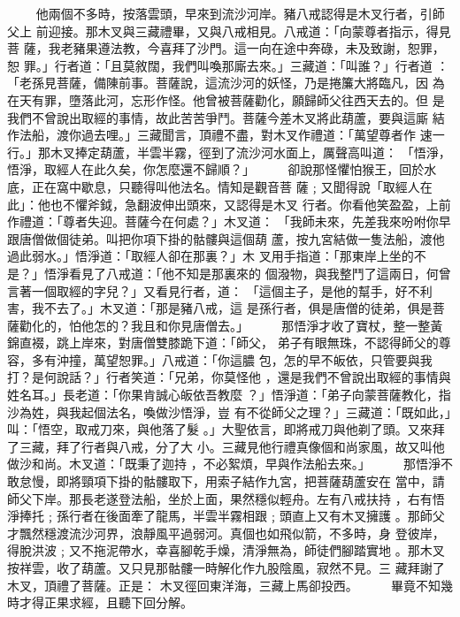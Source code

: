 \begin{pinyinscope}
{　　
他兩個不多時，按落雲頭，早來到流沙河岸。豬八戒認得是木叉行者，引師父上
前迎接。那木叉與三藏禮畢，又與八戒相見。八戒道：「向蒙尊者指示，得見菩
薩，我老豬果遵法教，今喜拜了沙門。這一向在途中奔碌，未及致謝，恕罪，恕
罪。」行者道：「且莫敘闊，我們叫喚那廝去來。」三藏道：「叫誰？」行者道
：「老孫見菩薩，備陳前事。菩薩說，這流沙河的妖怪，乃是捲簾大將臨凡，因
為在天有罪，墮落此河，忘形作怪。他曾被菩薩勸化，願歸師父往西天去的。但
是我們不曾說出取經的事情，故此苦苦爭鬥。菩薩今差木叉將此葫蘆，要與這廝
結作法船，渡你過去哩。」三藏聞言，頂禮不盡，對木叉作禮道：「萬望尊者作
速一行。」那木叉捧定葫蘆，半雲半霧，徑到了流沙河水面上，厲聲高叫道：
「悟淨，悟淨，取經人在此久矣，你怎麼還不歸順？」
　　
卻說那怪懼怕猴王，回於水底，正在窩中歇息，只聽得叫他法名。情知是觀音菩
薩﹔又聞得說「取經人在此」：他也不懼斧鉞，急翻波伸出頭來，又認得是木叉
行者。你看他笑盈盈，上前作禮道：「尊者失迎。菩薩今在何處？」木叉道：
「我師未來，先差我來吩咐你早跟唐僧做個徒弟。叫把你項下掛的骷髏與這個葫
蘆，按九宮結做一隻法船，渡他過此弱水。」悟淨道：「取經人卻在那裏？」木
叉用手指道：「那東岸上坐的不是？」悟淨看見了八戒道：「他不知是那裏來的
個潑物，與我整鬥了這兩日，何曾言著一個取經的字兒？」又看見行者，道：
「這個主子，是他的幫手，好不利害，我不去了。」木叉道：「那是豬八戒，這
是孫行者，俱是唐僧的徒弟，俱是菩薩勸化的，怕他怎的？我且和你見唐僧去。」
　　
那悟淨才收了寶杖，整一整黃錦直裰，跳上岸來，對唐僧雙膝跪下道：「師父，
弟子有眼無珠，不認得師父的尊容，多有沖撞，萬望恕罪。」八戒道：「你這膿
包，怎的早不皈依，只管要與我打？是何說話？」行者笑道：「兄弟，你莫怪他
，還是我們不曾說出取經的事情與姓名耳。」長老道：「你果肯誠心皈依吾教麼
？」悟淨道：「弟子向蒙菩薩教化，指沙為姓，與我起個法名，喚做沙悟淨，豈
有不從師父之理？」三藏道：「既如此，」叫：「悟空，取戒刀來，與他落了髮
。」大聖依言，即將戒刀與他剃了頭。又來拜了三藏，拜了行者與八戒，分了大
小。三藏見他行禮真像個和尚家風，故又叫他做沙和尚。木叉道：「既秉了迦持
，不必絮煩，早與作法船去來。」
　　
那悟淨不敢怠慢，即將頸項下掛的骷髏取下，用索子結作九宮，把菩薩葫蘆安在
當中，請師父下岸。那長老遂登法船，坐於上面，果然穩似輕舟。左有八戒扶持
，右有悟淨捧托﹔孫行者在後面牽了龍馬，半雲半霧相跟﹔頭直上又有木叉擁護
。那師父才飄然穩渡流沙河界，浪靜風平過弱河。真個也如飛似箭，不多時，身
登彼岸，得脫洪波﹔又不拖泥帶水，幸喜腳乾手燥，清淨無為，師徒們腳踏實地
。那木叉按祥雲，收了葫蘆。又只見那骷髏一時解化作九股陰風，寂然不見。三
藏拜謝了木叉，頂禮了菩薩。正是：
木叉徑回東洋海，三藏上馬卻投西。
　　
    畢竟不知幾時才得正果求經，且聽下回分解。


}
\end{pinyinscope}
